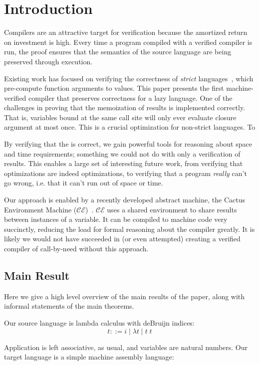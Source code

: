 \section{Introduction}

Compilers are an attractive target for verification because the amortized return
on investment is high. Every time a program compiled with a verified compiler is
run, the proof ensures that the semantics of the source language are being
preserved through execution. 

Existing work has focused on verifying the correctness of \emph{strict}
languages~\cite{chlipala2007certified, leroy2012compcert}, which pre-compute
function arguments to values. This paper presents the first machine-verified
compiler that preserves correctness for a lazy language. One of the challenges
in proving that the memoization of results is implemented correctly. That is, 
variables bound at the same call site will only ever evaluate closure argument
at most once. This is a crucial optimization for non-strict languages. To  

By verifying that the is correct, we gain powerful tools for reasoning
about space and time requirements; something we could not do with only a
verification of results. This enables a large set of interesting future work,
from verifying that optimizations are indeed optimizations, to verifying that a
program \emph{really} can't go wrong, i.e. that it can't run out of space or
time. 

Our approach is enabled by a recently developed abstract machine, the Cactus
Environment Machine ($\mathcal{CE}$)~\cite{?}. $\mathcal{CE}$ uses a shared
environment to share results between instances of a variable. It can be compiled
to machine code very succinctly, reducing the load for formal reasoning about
the compiler greatly. It is likely we would not have succeeded in (or even
attempted) creating a verified compiler of call-by-need without this approach.

\subsection{Main Result}
Here we give a high level overview of the main results of the paper, along with
informal statements of the main theorems.

Our source language is lambda calculus with deBruijn indices: 
$$ t ::= i \; | \; \lambda t \; | \; t \; t $$

Application is left associative, as usual, and variables are natural numbers.
Our target language is a simple machine assembly language:

